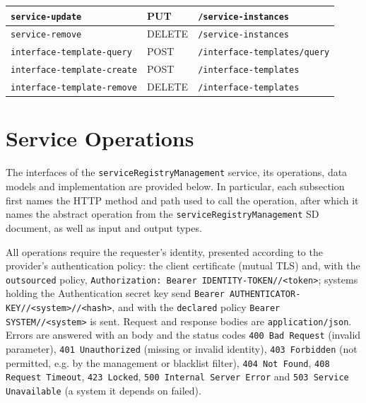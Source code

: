 \documentclass[a4paper]{arrowhead}
\newcommand{\mref}[2][]{{\textcolor{ArrowheadPurple}{\hyperref[sec:model:#2]{\ifstrempty{#1}{#2}{#1}}}}}
\begin{document}
\begin{longtable}{| p{5.2cm} | p{1.6cm} | p{8.4cm} |}
\texttt{service-\allowbreak{}update} & PUT & \texttt{/\allowbreak{}service-\allowbreak{}instances} \\ \hline
\texttt{service-\allowbreak{}remove} & DELETE & \texttt{/\allowbreak{}service-\allowbreak{}instances} \\ \hline
\texttt{interface-\allowbreak{}template-\allowbreak{}query} & POST & \texttt{/\allowbreak{}interface-\allowbreak{}templates/\allowbreak{}query} \\ \hline
\texttt{interface-\allowbreak{}template-\allowbreak{}create} & POST & \texttt{/\allowbreak{}interface-\allowbreak{}templates} \\ \hline
\texttt{interface-\allowbreak{}template-\allowbreak{}remove} & DELETE & \texttt{/\allowbreak{}interface-\allowbreak{}templates} \\ \hline
\end{longtable}

\newpage

\section{Service Operations}
\label{sec:operations}

The interfaces of the \texttt{service\allowbreak{}Registry\allowbreak{}Management} service, its operations, data models and implementation are provided below.
In particular, each subsection first names the HTTP method and path used to call the operation, after which it names the abstract operation from the \texttt{service\allowbreak{}Registry\allowbreak{}Management} SD document, as well as input and output types.

All operations require the requester's identity, presented according to the provider's authentication policy: the client certificate (mutual TLS) and, with the \texttt{outsourced} policy, \texttt{Authorization: Bearer IDENTITY-TOKEN//<token>}; systems holding the Authentication secret key send \texttt{Bearer AUTHENTICATOR-KEY//<system>//<hash>}, and with the \texttt{declared} policy \texttt{Bearer SYSTEM//<system>} is sent. Request and response bodies are \texttt{application/json}.
Errors are answered with an \mref{ErrorMessage} body and the status codes \texttt{400 Bad Request} (invalid parameter), \texttt{401 Unauthorized} (missing or invalid identity), \texttt{403 Forbidden} (not permitted, e.g. by the management or blacklist filter), \texttt{404 Not Found}, \texttt{408 Request Timeout}, \texttt{423 Locked}, \texttt{500 Internal Server Error} and \texttt{503 Service Unavailable} (a system it depends on failed).
\end{document}
